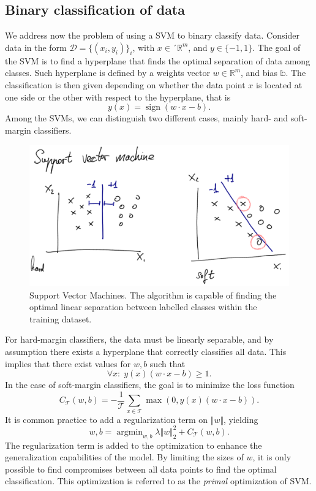 \documentclass[]{report}
\newcommand{\sign}{\ensuremath{\operatorname{sign}}}
\begin{document}
\subsection{Binary classification of data}

We address now the problem of using a SVM to binary classify data. Consider data in the form $\mathcal D = \{(x_i, y_i)\}_i$, with $x \in´ \mathbb R^m$, and $y \in \{-1,1\}$. The goal of the SVM is to find a hyperplane that finds the optimal separation of data among classes. Such hyperplane is defined by a weights vector $w \in \mathbb R^m$, and bias $\mathbb b$. The classification is then given depending on whether the data point $x$ is located at one side or the other with respect to the hyperplane, that is
\begin{equation}
y(x) = \sign\left( w \cdot x - b \right).
\end{equation}
Among the SVMs, we can distinguish two different cases, mainly hard- and soft-margin classifiers. 

\begin{figure}
\includegraphics[width = .9\linewidth]{images/SVM}
\caption{Support Vector Machines. The algorithm is capable of finding the optimal linear separation between labelled classes within the training dataset. }
\label{fig.svm}
\end{figure}

For hard-margin classifiers, the data must be linearly separable, and by assumption there exists a hyperplane that correctly classifies all data. This implies that there exist values for $w, b$ such that
\begin{equation}
\forall x: \; y(x) (w \cdot x - b) \geq 1.
\end{equation}
In the case of soft-margin classifiers, the goal is to minimize the loss function
\begin{equation}
C_{\mathcal T}(w, b) = - \frac{1}{\mathcal T}\sum_{x \in \mathcal T} \max\left(0, y(x) \left(w \cdot x - b \right)\right).
\end{equation}
It is common practice to add a regularization term on $\Vert w \Vert$, yielding
\begin{equation}
w, b = \operatorname{argmin}_{w, b} \lambda \Vert w \Vert^2_2 + C_{\mathcal T}(w, b).
\end{equation}
The regularization term is added to the optimization to enhance the generalization capabilities of the model. By limiting the sizes of $w$, it is only possible to find compromises between all data points to find the optimal classification. This optimization is referred to as the \textit{primal} optimization of SVM. 
\end{document}
